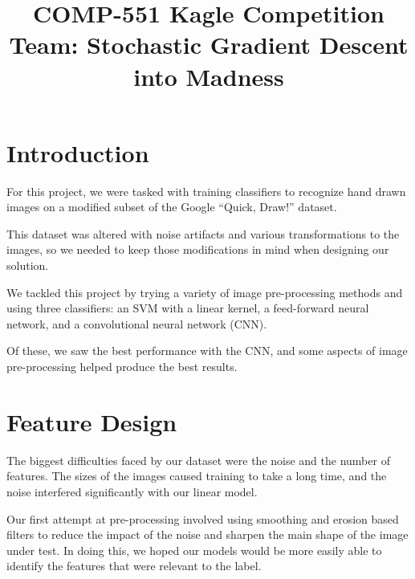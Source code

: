 \documentclass[conference]{IEEEtran}
\begin{document}
\title{COMP-551 Kagle Competition\\
{\Large Team: Stochastic Gradient Descent into Madness}
}

\author{
\and
{}
\and
{}
}

\maketitle

\section{\textbf{Introduction}}

For this project, we were tasked with training classifiers to recognize hand drawn images on a modified subset of the Google ``Quick, Draw!'' dataset.

This dataset was altered with noise artifacts and various transformations to the images, so we needed to keep those modifications in mind when designing our solution.

We tackled this project by trying a variety of image pre-processing methods and using three classifiers: an SVM with a linear kernel, a feed-forward neural network, and a convolutional neural network (CNN).

Of these, we saw the best performance with the CNN, and some aspects of image pre-processing helped produce the best results.

\section{\textbf{Feature Design}}

The biggest difficulties faced by our dataset were the noise and the number of features. The sizes of the images caused training to take a long time, and the noise interfered significantly with our linear model.

Our first attempt at pre-processing involved using smoothing and erosion based filters to reduce the impact of the noise and sharpen the main shape of the image under test. In doing this, we hoped our models would be more easily able to identify the features that were relevant to the label.
\end{document}
